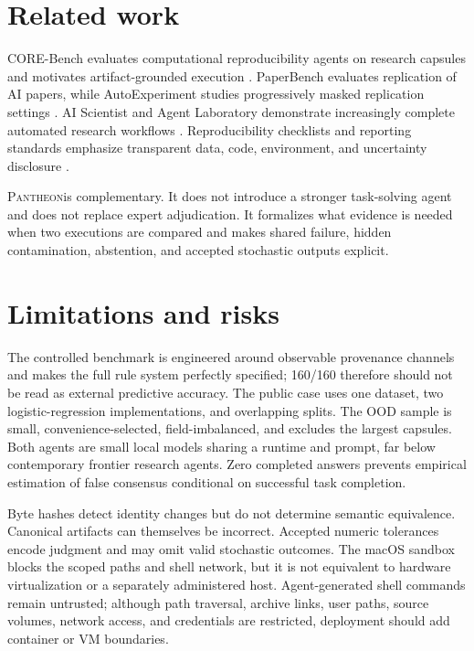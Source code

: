 \documentclass[10pt]{article}
\newcommand{\pantheon}{\textsc{Pantheon}}
\begin{document}
\section{Related work}
CORE-Bench evaluates computational reproducibility agents on research capsules and motivates artifact-grounded execution \citep{siegel2024corebench}. PaperBench evaluates replication of AI papers, while AutoExperiment studies progressively masked replication settings \citep{starace2025paperbench,kim2026autoexperiment}. AI Scientist and Agent Laboratory demonstrate increasingly complete automated research workflows \citep{lu2024aiscientist,schmidgall2025agentlaboratory}. Reproducibility checklists and reporting standards emphasize transparent data, code, environment, and uncertainty disclosure \citep{pineau2021reproducibility}.

\pantheon is complementary. It does not introduce a stronger task-solving agent and does not replace expert adjudication. It formalizes what evidence is needed when two executions are compared and makes shared failure, hidden contamination, abstention, and accepted stochastic outputs explicit.

\section{Limitations and risks}
The controlled benchmark is engineered around observable provenance channels and makes the full rule system perfectly specified; 160/160 therefore should not be read as external predictive accuracy. The public case uses one dataset, two logistic-regression implementations, and overlapping splits. The OOD sample is small, convenience-selected, field-imbalanced, and excludes the largest capsules. Both agents are small local models sharing a runtime and prompt, far below contemporary frontier research agents. Zero completed answers prevents empirical estimation of false consensus conditional on successful task completion.

Byte hashes detect identity changes but do not determine semantic equivalence. Canonical artifacts can themselves be incorrect. Accepted numeric tolerances encode judgment and may omit valid stochastic outcomes. The macOS sandbox blocks the scoped paths and shell network, but it is not equivalent to hardware virtualization or a separately administered host. Agent-generated shell commands remain untrusted; although path traversal, archive links, user paths, source volumes, network access, and credentials are restricted, deployment should add container or VM boundaries.
\end{document}

